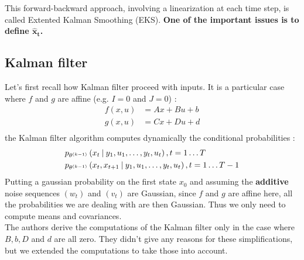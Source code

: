 
This forward-backward approach, involving a linearization at each time step, is called Extented Kalman Smoothing (EKS). \textbf{One of the important issues is to define $\mathbf{\hat{x}_t}$.}

\subsection{Kalman filter}
Let's first recall how Kalman filter proceed with inputs. It is a particular case where $f$ and $g$ are affine (e.g. $I=0$ and $J=0$) :
\begin{align*}
  f(x,u) &= Ax + Bu + b\\
  g(x,u) &= Cx + Du + d\\
\end{align*}
the Kalman filter algorithm computes dynamically the conditional probabilities :
\begin{align*}
  &p_{\theta^{(k-1)}}\left(x_t \mathbin{\vert} y_1, u_1, \ldots, y_t, u_t \right), t=1 \ldots T\\
  &p_{\theta^{(k-1)}}\left(x_t, x_{t+1} \mathbin{\vert} y_1, u_1, \ldots, y_t, u_t \right), t=1 \ldots T-1\\
\end{align*}
Putting a gaussian probability on the first state $x_0$ and assuming the \textbf{additive} noise sequences $(w_t)$ and $(v_t)$ are Gaussian, since $f$ and $g$ are affine here, all the probabilities we are dealing with are then Gaussian.
Thus we only need to compute means and covariances.\\

The authors derive the computations of the Kalman filter only in the case where $B,b,D$ and $d$ are all zero.
They didn't give any reasons for these simplifications, but we extended the computations to take those into account.\\

